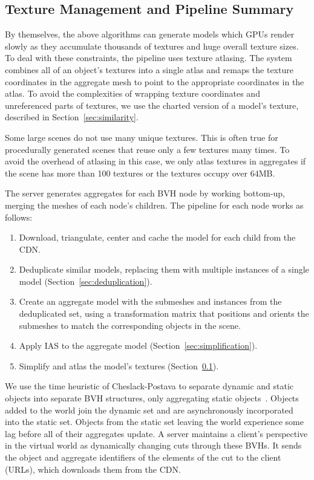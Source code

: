 \subsection{Texture Management and Pipeline Summary}
\label{sec:textures}

\label{sec:generation}

By themselves, the above algorithms can generate models which GPUs
render slowly as they accumulate thousands of textures and
huge overall texture sizes.  To deal with these constraints, the
pipeline uses texture atlasing. The system combines all of an object's
textures into a single atlas and remaps the texture coordinates in the
aggregate mesh to point to the appropriate coordinates in the atlas.
To avoid the complexities of wrapping texture coordinates and
unreferenced parts of textures, we use the charted version of a
model's texture, described in Section~\ref{sec:similarity}.


Some large scenes do not use many unique textures. This is often true
for procedurally generated scenes that reuse only a few textures
many times. To avoid the overhead of
atlasing in this case, we only atlas textures in
aggregates if the scene has more than 100 textures or the
textures occupy over 64MB.

The server generates aggregates for each BVH node by working
bottom-up, merging the meshes of each node's children. The pipeline
for each node works as follows:

\begin{enumerate}
\item Download, triangulate, center and cache the
model for each child from the CDN. 
\item Deduplicate similar models, replacing them 
with multiple instances of a single model (Section~\ref{sec:deduplication}). 
\item Create an aggregate model with the submeshes and
instances from the deduplicated set, using a transformation
matrix that positions and orients the submeshes to match the
corresponding objects in the scene.
\item Apply IAS to the aggregate model (Section~\ref{sec:simplification}).
\item Simplify and atlas the model's textures (Section~\ref{sec:textures}).
\end{enumerate}

We use the time heuristic of Cheslack-Postava \etal to separate
dynamic and static objects into separate BVH structures, only
aggregating static objects~\cite{ewencp2012}.  Objects added to the
world join the dynamic set and are asynchronously incorporated into
the static set. Objects from the static set leaving the world
experience some lag before all of their aggregates update.
A server maintains a client's perspective in the virtual world as
dynamically changing cuts through these BVHs. 
It sends the object and
aggregate identifiers of the elements of the cut to the client (URLs),
which downloads them from the CDN.
